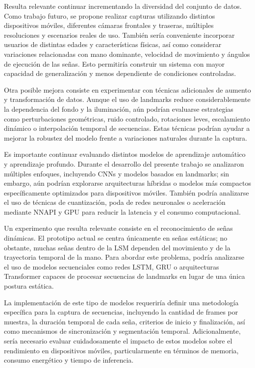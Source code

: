 	Resulta relevante continuar incrementando la diversidad del conjunto de datos. Como trabajo futuro, se propone realizar capturas utilizando distintos dispositivos móviles, diferentes cámaras frontales y traseras, múltiples resoluciones y escenarios reales de uso. También sería conveniente incorporar usuarios de distintas edades y características físicas, así como considerar variaciones relacionadas con mano dominante, velocidad de movimiento y ángulos de ejecución de las señas. Esto permitiría construir un sistema con mayor capacidad de generalización y menos dependiente de condiciones controladas.
	
	Otra posible mejora consiste en experimentar con técnicas adicionales de aumento y transformación de datos. Aunque el uso de landmarks reduce considerablemente la dependencia del fondo y la iluminación, aún podrían evaluarse estrategias como perturbaciones geométricas, ruido controlado, rotaciones leves, escalamiento dinámico o interpolación temporal de secuencias. Estas técnicas podrían ayudar a mejorar la robustez del modelo frente a variaciones naturales durante la captura.
	
	Es importante continuar evaluando distintos modelos de aprendizaje automático y aprendizaje profundo. Durante el desarrollo del presente trabajo se analizaron múltiples enfoques, incluyendo CNNs y modelos basados en landmarks; sin embargo, aún podrían explorarse arquitecturas híbridas o modelos más compactos específicamente optimizados para dispositivos móviles. También podría analizarse el uso de técnicas de cuantización, poda de redes neuronales o aceleración mediante NNAPI y GPU para reducir la latencia y el consumo computacional.
	
	Un experimento que resulta relevante consiste en el reconocimiento de señas dinámicas. El prototipo actual se centra únicamente en señas estáticas; no obstante, muchas señas dentro de la LSM dependen del movimiento y de la trayectoria temporal de la mano. Para abordar este problema, podría analizarse el uso de modelos secuenciales como redes LSTM, GRU o arquitecturas Transformer capaces de procesar secuencias de landmarks en lugar de una única postura estática.
	
	La implementación de este tipo de modelos requeriría definir una metodología específica para la captura de secuencias, incluyendo la cantidad de frames por muestra, la duración temporal de cada seña, criterios de inicio y finalización, así como mecanismos de sincronización y segmentación temporal. Adicionalmente, sería necesario evaluar cuidadosamente el impacto de estos modelos sobre el rendimiento en dispositivos móviles, particularmente en términos de memoria, consumo energético y tiempo de inferencia.
	
